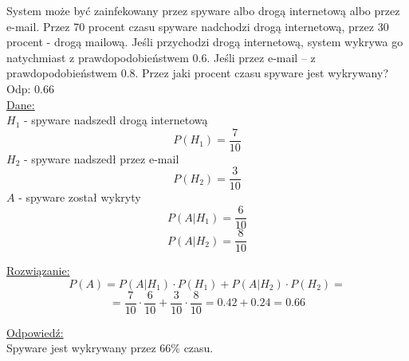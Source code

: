 \medskip
{} 
\medskip

System może być zainfekowany przez spyware albo drogą internetową albo przez e-mail. Przez 70 procent czasu spyware nadchodzi drogą internetową, przez 30 procent - drogą mailową. Jeśli przychodzi drogą internetową, system wykrywa go natychmiast z prawdopodobieństwem 0.6. Jeśli przez e-mail -- z prawdopodobieństwem 0.8. Przez jaki procent czasu spyware jest wykrywany? Odp: 0.66 \\

\underline{Dane:}
$$
$$
$H_{1}$ - spyware nadszedł drogą internetową
$$
P(H_{1}) = \frac{7}{10}
$$
$H_{2}$ - spyware  nadszedł przez e-mail
$$
P(H_{2}) = \frac{3}{10}
$$
$A$ -  spyware został wykryty
$$
P(A|H_{1}) = \frac{6}{10}
$$
$$
P(A|H_{2}) = \frac{8}{10}
$$

\underline{Rozwiązanie:}\\
$$
P(A) = P(A|H_{1}) \cdot P(H_{1}) + P(A|H_{2}) \cdot P(H_{2}) = 
$$
$$
= \frac{7}{10} \cdot  \frac{6}{10} + \frac{3}{10} \cdot \frac{8}{10} = 0.42 + 0.24 = 0.66
$$

\underline{Odpowiedź:} \\
Spyware jest wykrywany przez $66\%$ czasu.
